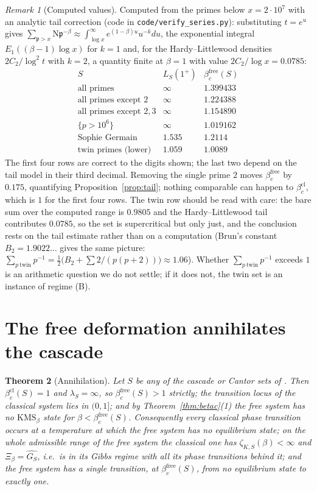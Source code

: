 \documentclass[11pt]{amsart}
\numberwithin{equation}{section}
\newtheorem{theorem}{Theorem}[section]
\theoremstyle{definition}
\theoremstyle{remark}
\newtheorem{remark}[theorem]{Remark}
\newcommand{\pp}{\mathfrak{p}}
\newcommand{\Ns}{\mathrm{N}}
\newcommand{\bfree}{\beta_c^{\mathrm{free}}}
\newcommand{\bcl}{\beta_c^{\mathrm{cl}}}
\begin{document}
\begin{remark}[Computed values]\label{rem:values}
Computed from the primes below $x=2\cdot10^7$ with an analytic tail correction (code in
\texttt{code/verify\_series.py}): substituting $t=e^u$ gives
$\sum_{\pp>x}\Ns\pp^{-\beta}\approx\int_{\log x}^\infty e^{(1-\beta)u}u^{-k}du$, the
exponential integral $E_1((\beta-1)\log x)$ for $k=1$ and, for the Hardy--Littlewood
densities $2C_2/\log^2t$ with $k=2$, a quantity finite at $\beta=1$ with value
$2C_2/\log x=0.0785$:
\[
\begin{array}{lcc}
S & L_S(1^+) & \bfree(S)\\\hline
\text{all primes} & \infty & 1.399433\\
\text{all primes except }2 & \infty & 1.224388\\
\text{all primes except }2,3 & \infty & 1.154890\\
\{p>10^6\} & \infty & 1.019162\\
\text{Sophie Germain} & 1.535 & 1.2114\\
\text{twin primes (lower)} & 1.059 & 1.0089
\end{array}
\]
The first four rows are correct to the digits shown; the last two depend on the tail
model in their third decimal. Removing the single prime $2$ moves $\bfree$ by $0.175$,
quantifying Proposition~\ref{prop:tail}; nothing comparable can happen to $\bcl$, which is
$1$ for the first four rows. The twin row should be read with care: the bare sum over the
computed range is $0.9805$ and the Hardy--Littlewood tail contributes $0.0785$, so the set
is supercritical but only just, and the conclusion rests on the tail estimate rather than
on a computation (Brun's constant $B_2=1.9022\ldots$ gives the same picture:
$\sum_{p\ \mathrm{twin}}p^{-1}=\tfrac12\bigl(B_2+\sum2/(p(p+2))\bigr)\approx1.06$).
Whether $\sum_{p\ \mathrm{twin}}p^{-1}$ exceeds $1$ is an arithmetic question we do not
settle; if it does not, the twin set is an instance of regime (B).
\end{remark}

\section{The free deformation annihilates the cascade}

\begin{theorem}[Annihilation]\label{thm:annih}
Let $S$ be any of the cascade or Cantor sets of \cite[Thm.~5.1, Cor.~6.2]{SeriesI}. Then
$\bcl(S)=1$ and $\lambda_S=\infty$, so $\bfree(S)>1$ strictly; the transition locus of the
classical system lies in $(0,1]$; and by Theorem~\ref{thm:betac}(1) the free system has no
$\mathrm{KMS}_\beta$ state for $\beta<\bfree(S)$. Consequently every classical phase
transition occurs at a temperature at which the free system has no equilibrium state; on the
whole admissible range of the free system the classical one has $\zeta_{K,S}(\beta)<\infty$
and $\Xi_\beta=\widehat{G_S}$, i.e.\ is in its Gibbs regime with all its phase transitions
behind it; and the free system has a single transition, at $\bfree(S)$, from no
equilibrium state to exactly one.
\end{theorem}
\end{document}

